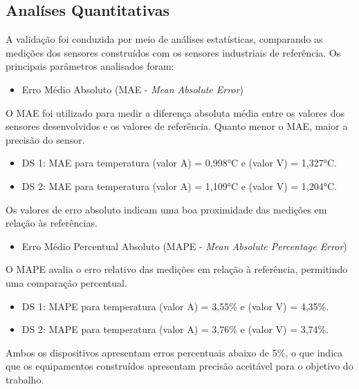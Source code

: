     


	\subsection{Analíses Quantitativas}
	
	A validação foi conduzida por meio de análises estatísticas, comparando as medições dos sensores construídos com os sensores industriais de referência. Os principais parâmetros analisados foram:


	\begin{itemize}
		\item  Erro Médio Absoluto (MAE - \textit{Mean Absolute Error})
		\end{itemize}
		\tab O \acrshort{MAE} foi utilizado para medir a diferença absoluta média entre os valores dos sensores desenvolvidos e os valores de referência. Quanto menor o \acrshort{MAE}, maior a precisão do sensor.
			\begin{itemize}
				\item \acrshort{DS} 1: \acrshort{MAE} para temperatura (valor A) = 0,998°C e (valor V) = 1,327°C.
				\item \acrshort{DS} 2: \acrshort{MAE} para temperatura (valor A) = 1,109°C e (valor V) = 1,204°C.
			\end{itemize}

		Os valores de erro absoluto indicam uma boa proximidade das medições em relação às referências.

	\begin{itemize}
		\item Erro Médio Percentual Absoluto (MAPE - \textit{Mean Absolute Percentage Error})
		\end{itemize}
		\tab O \acrshort{MAPE} avalia o erro relativo das medições em relação à referência, permitindo uma comparação percentual.
		\begin{itemize}
			\item \acrshort{DS} 1: \acrshort{MAPE} para temperatura (valor A) = 3,55\% e (valor V) = 4,35\%.
			\item \acrshort{DS} 2: \acrshort{MAPE} para temperatura (valor A) = 3,76\% e (valor V) = 3,74\%.
		\end{itemize}

		Ambos os dispositivos apresentam erros percentuais abaixo de 5\%, o que indica que 
		os equipamentos construídos apresentam precisão aceitável para o objetivo do trabalho.
	
